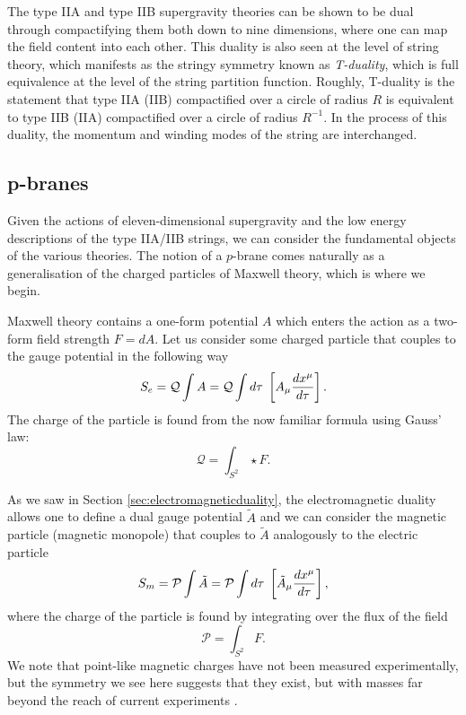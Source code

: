 The type IIA and type IIB supergravity theories can be shown to be dual through compactifying them both down to nine dimensions, where one can map the field content into each other. This duality is also seen at the level of string theory, which manifests as the stringy symmetry known as \emph{T-duality}, which is full equivalence at the level of the string partition function.  Roughly, T-duality is the statement that type IIA (IIB) compactified over a circle of radius $R$ is equivalent to type IIB (IIA) compactified over a circle of radius $R^{-1}$. In the process of this duality, the momentum and winding modes of the string are interchanged. 

\subsection{p-branes}

Given the actions of eleven-dimensional supergravity and the low energy descriptions of the type IIA/IIB strings, we can consider the fundamental objects of the various theories. The notion of a $p$-brane comes naturally as a generalisation of the charged particles of Maxwell theory, which is where we begin.

Maxwell theory contains a one-form potential $A$ which enters the action as a two-form field strength $F = dA$. Let us consider some charged particle that couples to the gauge potential in the following way
\begin{equation*}
	S_e = \mathcal{Q} \int A = \mathcal{Q} \int d\tau \; \left[ A_\mu  \frac{d x^\mu}{d \tau} \right].
\end{equation*}
The charge of the particle is found from the now familiar formula using Gauss' law:
\begin{equation*}
	\mathcal{Q} = \int_{S^2} \star F.
\end{equation*} 

As we saw in Section \ref{sec:electromagneticduality}, the electromagnetic duality allows one to define a dual gauge potential $\tilde{A}$ and we can consider the magnetic particle (magnetic monopole) that couples to $\tilde{A}$ analogously to the electric particle
\begin{equation*}
	S_m = \mathcal{P} \int \tilde{A} =\mathcal{P} \int d\tau \; \left[ \tilde{A}_\mu  \frac{d x^\mu}{d \tau} \right],
\end{equation*}
where the charge of the particle is found by integrating over the flux of the field
\begin{equation*}
	\mathcal{P} = \int_{S^2} F.
\end{equation*} 
We note that point-like magnetic charges have not been measured experimentally, but the symmetry we see here suggests that they exist, but with masses far beyond the reach of current experiments \cite{Becker:2007zj}. 

